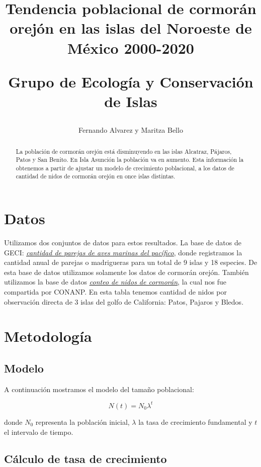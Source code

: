 \documentclass{article} %
\author{Fernando Alvarez y Maritza Bello}
\title{Tendencia poblacional de cormorán orejón en las islas del Noroeste de México 2000-2020\\ \begin{large} Grupo de Ecología y Conservación de Islas \end{large}}
\begin{document}
\maketitle

\begin{abstract}
La población de cormorán orejón está disminuyendo en las islas Alcatraz, Pájaros, Patos y San Benito. En Isla Asunción la población va en aumento. Esta información la obtenemos a partir de ajustar un modelo de crecimiento poblacional, a los datos de cantidad de nidos de cormorán orejón en once islas distintas.

\end{abstract}

\section*{Datos}

Utilizamos dos conjuntos de datos para estos resultados. La base de datos de GECI: \href{https://drive.google.com/drive/u/0/folders/1K2-itQXbNXPhrz4Pb3eRr9NG9A4rR47o}{{\color{blue}\textit{\underline{cantidad de parejas de aves marinas del pacífico}}}}, donde registramos la cantidad anual de parejas o madrigueras para un total de 9 islas y 18 especies. De esta base de datos utilizamos solamente los datos de cormorán orejón. También utilizamos la base de datos \href{https://drive.google.com/drive/folders/1aXmotwcGcZjK52USWMdlZoffaMUlI0tT}{{\color{blue}\textit{\underline{conteo de nidos de cormorán}}}}, la cual nos fue compartida por CONANP. En esta tabla tenemos cantidad de nidos por observación directa de 3 islas del golfo de California: Patos, Pajaros y Bledos.


\section*{Metodología}
\subsection*{Modelo}
A continuación mostramos el modelo del tamaño poblacional:

\begin{equation}
N(t)=N_{0}\lambda^{t}
\end{equation}

\noindent donde $N_{0}$ representa la población inicial, $\lambda$ la tasa de crecimiento fundamental y $t$ el intervalo de tiempo. 

\subsection*{Cálculo de tasa de crecimiento}
\end{document}

